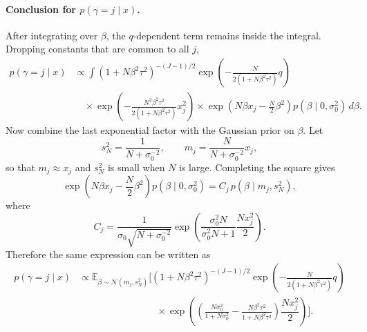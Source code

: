 \documentclass[11pt]{article}
\newcommand{\E}{\mathbb E}
\newcommand{\Normal}{\mathcal N}
\begin{document}
\paragraph{Conclusion for $p(\gamma=j\mid x)$.}
After integrating over $\beta$, the $q$-dependent term remains inside the integral. Dropping constants that are common to all $j$,
\begin{align*}
p(\gamma=j \mid x)
&\propto
\int
(1+N\beta^2\tau^2)^{-(J-1)/2}
\exp\!\left(-\frac{N}{2(1+N\beta^2\tau^2)}q\right) \\
&\quad\times
\exp\!\left(-\frac{N^2\beta^2\tau^2}{2(1+N\beta^2\tau^2)} x_j^2 \right) \times
\exp\!\left(N\beta x_j - \frac{N}{2}\beta^2\right)
p(\beta \mid 0,\sigma_0^2)\,d\beta .
\end{align*}
Now combine the last exponential factor with the Gaussian prior on $\beta$.
Let
\[
s_N^2 = \frac{1}{N+\sigma_0^{-2}},
\qquad
m_j = \frac{N}{N+\sigma_0^{-2}}x_j,
\]
so that $m_j \approx x_j$ and $s_N^2$ is small when $N$ is large. Completing
the square gives
\[
\exp\!\left(N\beta x_j - \frac{N}{2}\beta^2\right)
p(\beta \mid 0,\sigma_0^2)
=
C_j\,p(\beta \mid m_j,s_N^2),
\]
where
\[
C_j =
\frac{1}{\sigma_0\sqrt{N+\sigma_0^{-2}}}
\exp\!\left(
  \frac{\sigma_0^{2} N}{\sigma_0^{2} N+1}\frac{Nx_j^2}{2}
\right).
\]
Therefore the same expression can be written as
\begin{align*}
p(\gamma=j \mid x)
&\propto
\E_{\beta \sim \Normal(m_j,s_N^2)}
\Bigg[
(1+N\beta^2\tau^2)^{-(J-1)/2}
\exp\!\left(-\frac{N}{2(1+N\beta^2\tau^2)}q\right) \\
&\hspace{8em}\times
\exp\!\left(\left( \frac{N\sigma_0^2}{1+N\sigma_0^2} - \frac{N\beta^2\tau^2}{1+N\beta^2\tau^2} \right) \dfrac{N x_j^2}{2}\right)
\Bigg].
\end{align*}
\end{document}
